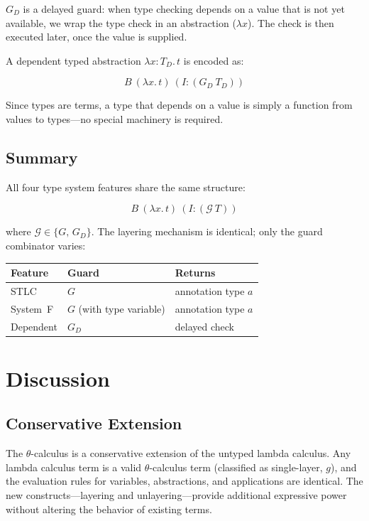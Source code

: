 \documentclass[11pt,letterpaper]{article}
\theoremstyle{definition}
\begin{document}
$G_D$ is a delayed guard: when type checking depends on a value that is not
yet available, we wrap the type check in an abstraction ($\lambda x$). The
check is then executed later, once the value is supplied.

A dependent typed abstraction $\lambda x{:}T_D.\, t$ is encoded as:

$$
B\ (\lambda x.\,t)\ (I{:}(G_D\ T_D))
$$

Since types are terms, a type that depends on a value is simply a function
from values to types---no special machinery is required.

\subsection{Summary}

All four type system features share the same structure:

$$
B\ (\lambda x.\,t)\ (I{:}(\mathcal{G}\ T))
$$

\noindent where $\mathcal{G} \in \{G,\, G_D\}$. The layering
mechanism is identical; only the guard combinator varies:

\medskip
\begin{center}
\begin{tabular}{lll}
\textbf{Feature} & \textbf{Guard} & \textbf{Returns} \\
\hline
STLC & $G$ & annotation type $a$ \\
System~F & $G$ (with type variable) & annotation type $a$ \\
Dependent & $G_D$ & delayed check \\
\end{tabular}
\end{center}


\section{Discussion}\label{sec:discussion}

\subsection{Conservative Extension}

The $\theta$-calculus is a conservative extension of the untyped lambda
calculus. Any lambda calculus term is a valid $\theta$-calculus term
(classified as single-layer, $g$), and the evaluation rules for variables,
abstractions, and applications are identical. The new
constructs---layering and unlayering---provide additional expressive power
without altering the behavior of existing terms.
\end{document}
